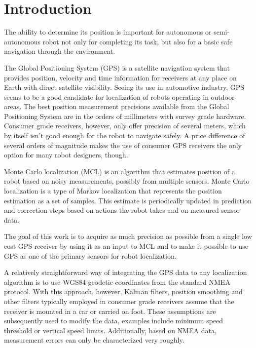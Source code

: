 \chapter{Introduction}


The ability to determine its position is important for autonomous or semi-autonomous robot
not only for completing its task, but also for a basic
safe navigation through the environment.


The Global Positioning System (GPS) is a satellite navigation system that
provides position, velocity and time information for receivers at any place on Earth with direct
satellite visibility.
Seeing its use in automotive industry, GPS seems to be a good candidate for
localization of robots operating in outdoor areas.
The best position measurement precisions available from the Global Positioning System
are in the orders of millimeters with survey grade hardware.
Consumer grade receivers, however, only offer precision of several meters, which
by itself isn't good enough for the robot to navigate safely.
A price difference of several orders of magnitude makes the use of consumer GPS
receivers the only option for many robot designers, though.


Monte Carlo localization (MCL) is an algorithm that estimates position of a robot
based on noisy measurements, possibly from multiple sensors.
Monte Carlo localization is a type of Markov localization that represents the position estimation as
a set of samples.
This estimate is periodically updated in prediction and correction steps based on
actions the robot takes and on measured sensor data.


\vspace{1.5em}

The goal of this work is to acquire as much precision as possible from a single low cost
GPS receiver by using it as an input to MCL and to make it possible to use
GPS as one of the primary sensors for robot localization.

A relatively straightforward way of integrating the GPS data to any localization algorithm is
to use WGS84 geodetic coordinates from the standard NMEA protocol.
With this approach, however, Kalman filters, position smoothing and other filters typically
employed in  consumer grade receivers assume that the receiver is mounted in a car or carried on foot.
These assumptions are subsequently used to modify the data, examples
include minimum speed threshold or vertical speed limits.
Additionally, based on NMEA data, measurement errors can only be characterized very roughly.

